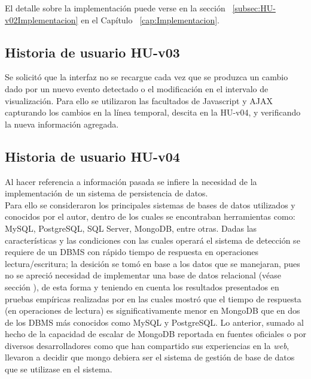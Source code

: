 El detalle sobre la implementación puede verse en la sección ~\ref{subsec:HU-v02Implementacion} en el Capítulo ~\ref{cap:Implementacion}.\\

\subsection{Historia de usuario HU-v03}
\label{subsec:HU-v03}

Se solicitó que la interfaz no se recargue cada vez que se produzca un cambio dado por un nuevo evento detectado o el modificación en el intervalo de visualización. Para ello se utilizaron las facultados de Javascript y AJAX capturando los cambios en la línea temporal, descita en la HU-v04, y verificando la nueva información agregada.

\subsection{Historia de usuario HU-v04}
\label{subsec:HU-v04}

Al hacer referencia a información pasada se infiere la necesidad de la implementación de un sistema de persistencia de datos.\\

Para ello se consideraron los principales sistemas de bases de datos utilizados y conocidos por el autor, dentro de los cuales se encontraban herramientas como: MySQL, PostgreSQL, SQL Server, MongoDB, entre otras. Dadas las características y las condiciones con las cuales operará el sistema de detección se requiere de un DBMS con rápido tiempo de respuesta en operaciones lectura/escritura; la desición se tomó en base a los datos que se manejaran, pues no se apreció necesidad de implementar una base de datos relacional (véase sección \cite{subsec:BaseDeDatos}), de esta forma y teniendo en cuenta los resultados presentados en pruebas empíricas realizadas por \cite{MongoPerformance} en las cuales mostró que el tiempo de respuesta (en operaciones de lectura) es significativamente menor en MongoDB que en dos de los DBMS más conocidos como MySQL y PostgreSQL. Lo anterior, sumado al hecho de la capacidad de escalar de MongoDB reportada en fuentes oficiales o por diversos desarrolladores como \cite{MongoDBScalability} que han compartido sus experiencias en la \textit{web}, llevaron a decidir que mongo debiera ser el sistema de gestión de base de datos que se utilizase en el sistema.\\

